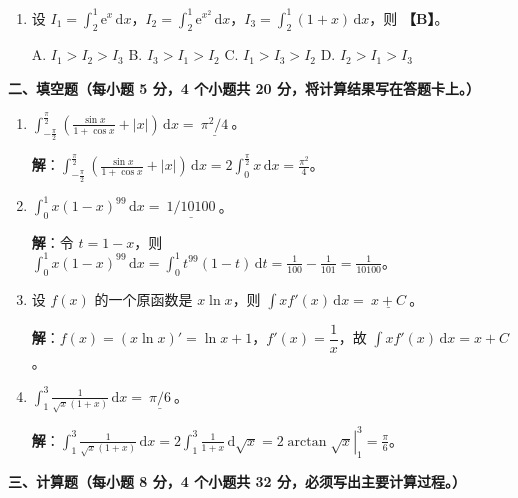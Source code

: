 \documentclass[a4paper,11pt]{ctexart}
\newcommand{\dd}{\,\mathrm{d}}
\newcommand{\e}{\mathrm{e}}
\begin{document}
\begin{enumerate}[label=\arabic*., leftmargin=2em, itemsep=0.7em, topsep=0.6em]
  \item 设 $I_1=\displaystyle\int_2^1 \e^x\dd x$，$I_2=\displaystyle\int_2^1 \e^{x^2}\dd x$，$I_3=\displaystyle\int_2^1 (1+x)\dd x$，则 \textbf{【B】}。

  A. $I_1>I_2>I_3$ \qquad\quad
  B. $I_3>I_1>I_2$ \qquad\quad
  C. $I_1>I_3>I_2$ \qquad\quad
  D. $I_2>I_1>I_3$
\end{enumerate}

\vspace{0.8em}

\textbf{二、填空题（每小题 5 分，4 个小题共 20 分，将计算结果写在答题卡上。）}

\begin{enumerate}[label=\arabic*., start=5, leftmargin=2em, itemsep=0.8em, topsep=0.5em]
  \item $\displaystyle\int_{-\frac{\pi}{2}}^{\frac{\pi}{2}}\left(\frac{\sin x}{1+\cos x}+|x|\right)\dd x=\underline{\ \pi^2/4\ }$。

  \textbf{解}：$\displaystyle\int_{-\frac{\pi}{2}}^{\frac{\pi}{2}}\left(\frac{\sin x}{1+\cos x}+|x|\right)\dd x = 2\int_0^{\frac{\pi}{2}}x\dd x = \frac{\pi^2}{4}$。

  \item $\displaystyle\int_0^1 x(1-x)^{99}\dd x=\underline{\ 1/10100\ }$。

  \textbf{解}：令 $t=1-x$，则 $\displaystyle\int_0^1 x(1-x)^{99}\dd x = \int_0^1 t^{99}(1-t)\dd t = \frac{1}{100}-\frac{1}{101} = \frac{1}{10100}$。

  \item 设 $f(x)$ 的一个原函数是 $x\ln x$，则 $\displaystyle\int xf'(x)\dd x=\underline{\ x+C\ }$。

  \textbf{解}：$f(x)=(x\ln x)'=\ln x+1$，$f'(x)=\dfrac{1}{x}$，故 $\displaystyle\int xf'(x)\dd x=x+C$。

  \item $\displaystyle\int_1^3 \frac{1}{\sqrt{x}(1+x)}\dd x=\underline{\ \pi/6\ }$。

  \textbf{解}：$\displaystyle\int_1^3\frac{1}{\sqrt{x}(1+x)}\dd x = 2\int_1^3\frac{1}{1+x}\dd\sqrt{x} = \left.2\arctan\sqrt{x}\right|_1^3 = \frac{\pi}{6}$。
\end{enumerate}

\vspace{0.8em}

\textbf{三、计算题（每小题 8 分，4 个小题共 32 分，必须写出主要计算过程。）}
\end{document}
